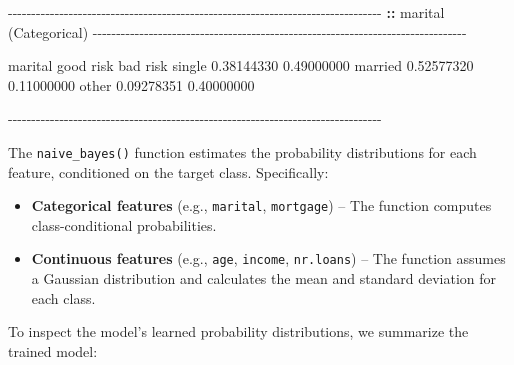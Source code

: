 \documentclass[
  11pt,
]{book}
\makeatletter
\newenvironment{Shaded}{}{}
\newcommand{\ErrorTok}[1]{\textcolor[rgb]{0.21,0.21,0.21}{\textbf{#1}}}
\newcommand{\FloatTok}[1]{#1}
\newcommand{\FunctionTok}[1]{#1}
\newcommand{\NormalTok}[1]{#1}
\newcommand{\SpecialCharTok}[1]{\textcolor[rgb]{0.39,0.39,0.39}{#1}}
\providecommand{\tightlist}{%
  \setlength{\itemsep}{0pt}\setlength{\parskip}{0pt}}
\newenvironment{kframe}{%
\medskip{}
\setlength{\fboxsep}{.8em}
 \def\at@end@of@kframe{}%
 \ifinner\ifhmode%
  \def\at@end@of@kframe{\end{minipage}}%
  \begin{minipage}{\columnwidth}%
 \fi\fi%
 \def\FrameCommand##1{\hskip\@totalleftmargin \hskip-\fboxsep
 \colorbox{shadecolor}{##1}\hskip-\fboxsep
     \hskip-\linewidth \hskip-\@totalleftmargin \hskip\columnwidth}%
 \MakeFramed {\advance\hsize-\width
   \@totalleftmargin\z@ \linewidth\hsize
   \@setminipage}}%
 {\par\unskip\endMakeFramed%
 \at@end@of@kframe}
\renewenvironment{Shaded}{\begin{kframe}}{\end{kframe}}
\theoremstyle{definition}
\theoremstyle{definition}
\theoremstyle{definition}
\theoremstyle{definition}
\theoremstyle{remark}
\makeatother
\begin{document}
\begin{Shaded}
\begin{Highlighting}[]
   \SpecialCharTok{{-}{-}{-}{-}{-}{-}{-}{-}{-}{-}{-}{-}{-}{-}{-}{-}{-}{-}{-}{-}{-}{-}{-}{-}{-}{-}{-}{-}{-}{-}{-}{-}{-}{-}{-}{-}{-}{-}{-}{-}{-}{-}{-}{-}{-}{-}{-}{-}{-}{-}{-}{-}{-}{-}{-}{-}{-}{-}{-}{-}{-}{-}{-}{-}{-}{-}{-}{-}{-}{-}{-}{-}{-}{-}{-}{-}{-}{-}{-}{-}} 
   \ErrorTok{::} \FunctionTok{marital}\NormalTok{ (Categorical) }
   \SpecialCharTok{{-}{-}{-}{-}{-}{-}{-}{-}{-}{-}{-}{-}{-}{-}{-}{-}{-}{-}{-}{-}{-}{-}{-}{-}{-}{-}{-}{-}{-}{-}{-}{-}{-}{-}{-}{-}{-}{-}{-}{-}{-}{-}{-}{-}{-}{-}{-}{-}{-}{-}{-}{-}{-}{-}{-}{-}{-}{-}{-}{-}{-}{-}{-}{-}{-}{-}{-}{-}{-}{-}{-}{-}{-}{-}{-}{-}{-}{-}{-}{-}} 
            
\NormalTok{   marital    good risk   bad risk}
\NormalTok{     single  }\FloatTok{0.38144330} \FloatTok{0.49000000}
\NormalTok{     married }\FloatTok{0.52577320} \FloatTok{0.11000000}
\NormalTok{     other   }\FloatTok{0.09278351} \FloatTok{0.40000000}
   
   \SpecialCharTok{{-}{-}{-}{-}{-}{-}{-}{-}{-}{-}{-}{-}{-}{-}{-}{-}{-}{-}{-}{-}{-}{-}{-}{-}{-}{-}{-}{-}{-}{-}{-}{-}{-}{-}{-}{-}{-}{-}{-}{-}{-}{-}{-}{-}{-}{-}{-}{-}{-}{-}{-}{-}{-}{-}{-}{-}{-}{-}{-}{-}{-}{-}{-}{-}{-}{-}{-}{-}{-}{-}{-}{-}{-}{-}{-}{-}{-}{-}{-}{-}}
\end{Highlighting}
\end{Shaded}

The \texttt{naive\_bayes()} function estimates the probability distributions for each feature, conditioned on the target class. Specifically:

\begin{itemize}
\tightlist
\item
  \textbf{Categorical features} (e.g., \texttt{marital}, \texttt{mortgage}) -- The function computes class-conditional probabilities.\\
\item
  \textbf{Continuous features} (e.g., \texttt{age}, \texttt{income}, \texttt{nr.loans}) -- The function assumes a Gaussian distribution and calculates the mean and standard deviation for each class.
\end{itemize}

To inspect the model's learned probability distributions, we summarize the trained model:
\end{document}
